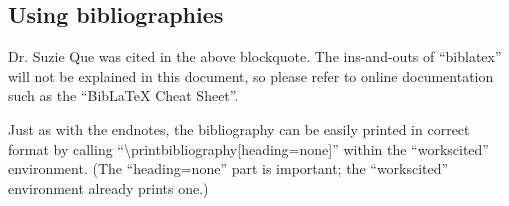 \documentclass[mla8]{mla}
\begin{document}
\begin{paper}
\section{Using bibliographies}

Dr. Suzie Que was cited in the above blockquote.
The ins-and-outs of ``biblatex'' will not be explained in this
document, so please refer to online documentation such as the
``BibLaTeX Cheat Sheet''.

Just as with the endnotes,
the bibliography can be easily printed in correct format by calling
``\textbackslash{}printbibliography[heading=none]'' within the
``workscited'' environment.
(The ``heading=none'' part is important; the ``workscited'' environment
already prints one.)

\end{paper}

\begin{notes}

\printendnotes

\end{notes}

\begin{workscited}

\printbibliography[heading=none]

\end{workscited}
\end{document}
